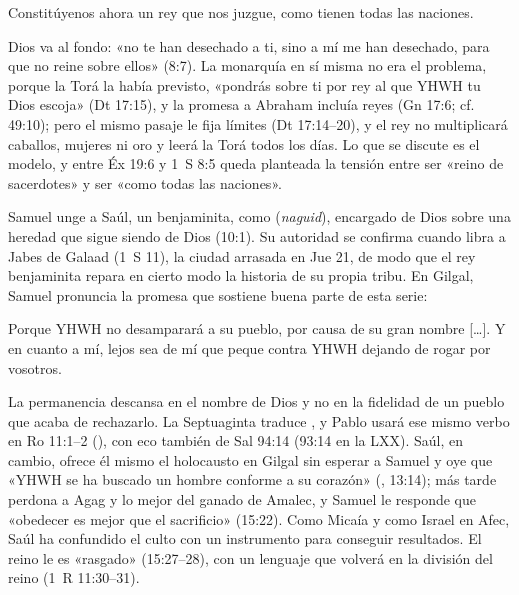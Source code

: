 \begin{cita}Constitúyenos ahora un rey que nos juzgue, como tienen todas las naciones.\end{cita}

Dios va al fondo: «no te han desechado a ti, sino a mí me han desechado, para que no reine sobre ellos» (8:7). La monarquía en sí misma no era el problema, porque la Torá la había previsto, «pondrás sobre ti por rey al que YHWH tu Dios escoja» (Dt 17:15), y la promesa a Abraham incluía reyes (Gn 17:6; cf. 49:10); pero el mismo pasaje le fija límites (Dt 17:14--20), y el rey no multiplicará caballos, mujeres ni oro y leerá la Torá todos los días. Lo que se discute es el modelo, y entre Éx 19:6 y 1~S 8:5 queda planteada la tensión entre ser «reino de sacerdotes» y ser «como todas las naciones».

Samuel unge a Saúl, un benjaminita, como  (\emph{naguid}), encargado de Dios sobre una heredad que sigue siendo de Dios (10:1). Su autoridad se confirma cuando libra a Jabes de Galaad (1~S 11), la ciudad arrasada en Jue 21, de modo que el rey benjaminita repara en cierto modo la historia de su propia tribu. En Gilgal, Samuel pronuncia la promesa que sostiene buena parte de esta serie:

\begin{cita}Porque YHWH no desamparará a su pueblo, por causa de su gran nombre [\ldots]. Y en cuanto a mí, lejos sea de mí que peque contra YHWH dejando de rogar por vosotros.\end{cita}

La permanencia descansa en el nombre de Dios y no en la fidelidad de un pueblo que acaba de rechazarlo. La Septuaginta traduce , y Pablo usará ese mismo verbo en Ro 11:1--2 (), con eco también de Sal 94:14 (93:14 en la LXX). Saúl, en cambio, ofrece él mismo el holocausto en Gilgal sin esperar a Samuel y oye que «YHWH se ha buscado un hombre conforme a su corazón» (, 13:14); más tarde perdona a Agag y lo mejor del ganado de Amalec, y Samuel le responde que «obedecer es mejor que el sacrificio» (15:22). Como Micaía y como Israel en Afec, Saúl ha confundido el culto con un instrumento para conseguir resultados. El reino le es «rasgado» (15:27--28), con un lenguaje que volverá en la división del reino (1~R 11:30--31).

